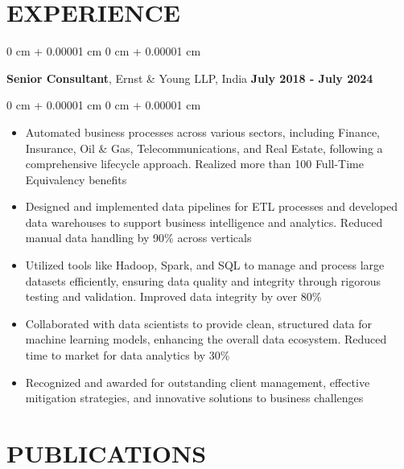 \documentclass[10pt, letterpaper]{article}
\newenvironment{highlights}{
    \begin{itemize}[
        topsep=0.10 cm,
        parsep=0.10 cm,
        partopsep=0pt,
        itemsep=0pt,
        leftmargin=0 cm + 10pt
    ]
}{
    \end{itemize}
} %
\newenvironment{onecolentry}{
    \begin{adjustwidth}{
        0 cm + 0.00001 cm
    }{
        0 cm + 0.00001 cm
    }
}{
    \end{adjustwidth}
} %
\newenvironment{twocolentry}[2][]{
    \onecolentry
    \def\secondColumn{#2}
    \setcolumnwidth{\fill, 4.5 cm}
    \begin{paracol}{2}
}{
    \switchcolumn \raggedleft \secondColumn
    \end{paracol}
    \endonecolentry
} %
\begin{document}
\vspace{0.10 cm}





    

    \section{EXPERIENCE}

        
        \begin{twocolentry}{
            \textbf{July 2018 - July 2024}
        }
            \textbf{Senior Consultant}, Ernst \& Young LLP, India\end{twocolentry}

        \vspace{0.10 cm}
        \begin{onecolentry}
            \begin{highlights}
                \item Automated business processes across various sectors, including Finance, Insurance, Oil \& Gas, Telecommunications, and Real Estate, following a comprehensive lifecycle approach. Realized more than 100 Full-Time Equivalency benefits
                \item Designed and implemented data pipelines for ETL processes and developed data warehouses to support business intelligence and analytics. Reduced manual data handling by 90\% across verticals
                \item Utilized tools like Hadoop, Spark, and SQL to manage and process large datasets efficiently, ensuring data quality and integrity through rigorous testing and validation. Improved data integrity by over 80\%
                \item Collaborated with data scientists to provide clean, structured data for machine learning models, enhancing the overall data ecosystem. Reduced time to market for data analytics by 30\%
                \item Recognized and awarded for outstanding client management, effective mitigation strategies, and innovative solutions to business challenges
            \end{highlights}
        \end{onecolentry}


   \vspace{0.10 cm}    
   
   \section{PUBLICATIONS}
\end{document}
